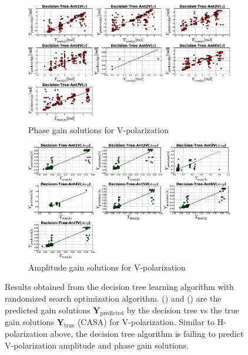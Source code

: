 \begin{figure}[H]
   \centering
    \begin{subfigure}[t]{0.52\textheight}
        
        \includegraphics[width=\textwidth]{images/Decision-TreeVphase.eps} 
        \caption{Phase gain solutions for V-polarization}
         \label{A1}
    \end{subfigure}
    
      \begin{subfigure}[t]{0.52\textheight}
       
        \includegraphics[width=\textwidth]{images/Decision-TreeVamp.eps} 
        \caption{Amplitude gain solutions for V-polarization} 
        \label{B1}
    \end{subfigure}
    \caption{Results obtained from the decision tree learning algorithm with randomized search optimization algorithm. () and () are the predicted gain solutions $\textbf{Y}_\mathrm{predicted}$ by the decision tree vs the true gain solutions $\textbf{Y}_\mathrm{true}$ (CASA) for V-polarization. Similar to H-polarization above, the decision tree algorithm is failing to predict V-polarization amplitude and phase gain solutions.}
 \label{BB1}
    \end{figure}
    
